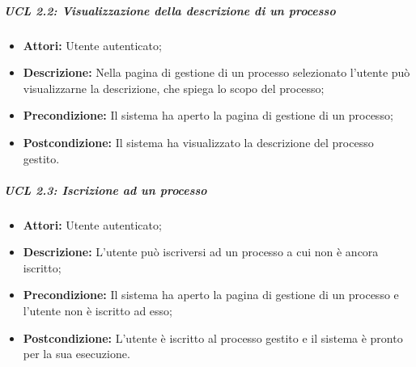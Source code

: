 \subparagraph{UCL 2.2: Visualizzazione della descrizione di un processo}
\begin{itemize}
\item \textbf{Attori:} Utente autenticato;
\item \textbf{Descrizione:} Nella pagina di gestione di un processo selezionato l'utente può visualizzarne la descrizione, che spiega lo scopo del processo;
\item \textbf{Precondizione:} Il sistema ha aperto la pagina di gestione di un processo;
\item \textbf{Postcondizione:} Il sistema ha visualizzato la descrizione del processo gestito.
\end{itemize}

\subparagraph{UCL 2.3: Iscrizione ad un processo}
\begin{itemize}
\item \textbf{Attori:} Utente autenticato;
\item \textbf{Descrizione:} L'utente può iscriversi ad un processo a cui non è ancora iscritto;
\item \textbf{Precondizione:} Il sistema ha aperto la pagina di gestione di un processo e l'utente non è iscritto ad esso;
\item \textbf{Postcondizione:} L'utente è iscritto al processo gestito e il sistema è pronto per la sua esecuzione.
\end{itemize}

